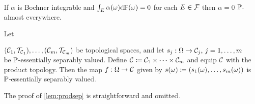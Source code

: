 \label{lem:gotoae}

\

\noindent If $\alpha$ is  Bochner integrable and  $\int_E \alpha(\omega) \mathrm{d}\mathbb P(\omega) = 0 $ for each $E \in \mathcal F$ then $\alpha=0$ $\mathbb P$-almost everywhere.
\ele

\label{lem:prodsep}
Let 

\noindent $\mleft(\cCo,\Top{\cCo}\mright),\ldots,\mleft(\cCm,\Top{\cCm}\mright)$ be topological spaces, and let $s_j:\Omega\rightarrow\mathcal C_{j},\,j=1,\ldots,m$ be $\mathbb P$-essentially separably valued. Define $\mathcal C \coloneqq \mathcal C_{1} \times \cdots \times \mathcal C_{m}$ and equip $\mathcal C$ with the product topology. Then the map $f:\Omega\rightarrow \mathcal C$ given by $s(\omega) \de \mleft(s_1(\omega),\ldots,s_m(\omega)\mright) $ is $\mathbb P$-essentially separably valued.
\ele

The proof of \cref{lem:prodsep} is straightforward and omitted.
